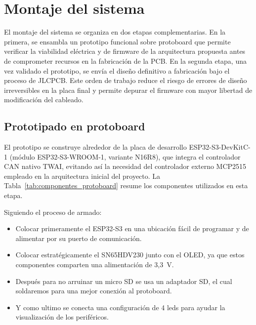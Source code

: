\section{Montaje del sistema}

El montaje del sistema se organiza en dos etapas complementarias. En la primera, se ensambla un prototipo funcional sobre protoboard que permite verificar la viabilidad eléctrica y de firmware de la arquitectura propuesta antes de comprometer recursos en la fabricación de la PCB. En la segunda etapa, una vez validado el prototipo, se envía el diseño definitivo a fabricación bajo el proceso de JLCPCB. Este orden de trabajo reduce el riesgo de errores de diseño irreversibles en la placa final y permite depurar el firmware con mayor libertad de modificación del cableado.

\subsection{Prototipado en protoboard}

El prototipo se construye alrededor de la placa de desarrollo ESP32-S3-DevKitC-1 (módulo ESP32-S3-WROOM-1, variante N16R8), que integra el controlador CAN nativo TWAI, evitando así la necesidad del controlador externo MCP2515 empleado en la arquitectura inicial del proyecto. La Tabla~\ref{tab:componentes_protoboard} resume los componentes utilizados en esta etapa.



Siguiendo el proceso de armado:

\begin{itemize}
	\item Colocar primeramente el ESP32-S3 en una ubicación fácil de programar y de alimentar por su puerto de comunicación.
	\item Colocar estratégicamente el SN65HDV230 junto con el OLED, ya que estos componentes comparten una alimentación de 3,3~V.
	\item Después para no arruinar un micro SD se usa un adaptador SD, el cual soldaremos para una mejor conexión al protoboard.
	\item Y como ultimo se conecta una configuración de 4 leds para ayudar la visualización de los periféricos.
	
\end{itemize}

